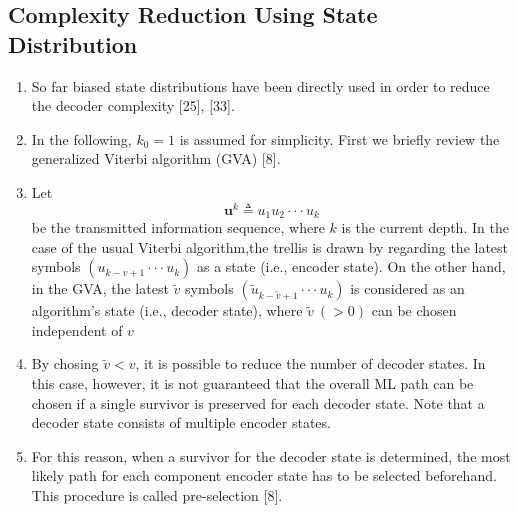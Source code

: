 \documentclass[fontsize=12pt]{article}
\theoremstyle{definition}
\begin{document}
\subsection{Complexity Reduction Using State Distribution}
\begin{enumerate}
\item So far biased state distributions have been directly used
in order to reduce the decoder complexity [25], [33]. 

\item In the
following, $k_0 = 1$ is assumed for simplicity. First we briefly
review the generalized Viterbi algorithm (GVA) [8].

\item Let 
\begin{equation}
\mathbf{u}^k \triangleq u_1u_2 \cdot \cdot \cdot u_k
\end{equation}
be the transmitted information sequence, where $k$ is the current depth. In the case of the usual Viterbi algorithm,the trellis is drawn by regarding the latest symbols $(u_{k-v+1} \cdot \cdot \cdot u_k)$
as a state (i.e., encoder state). On the other hand, in the
GVA, the latest $\tilde{v}$ symbols $(\tilde{u}_{k-\tilde{v}+1} \cdot \cdot \cdot u_k)$ is considered as an algorithm’s state (i.e., decoder state), where $\tilde{v} ~ (> 0)$  can
be chosen independent of $v$

\item By chosing $\tilde{v} <v$, it is possible to reduce the number
of decoder states. In this case, however, it is
not guaranteed that the overall ML path can be chosen if a
single survivor is preserved for each decoder state. Note that
a decoder state consists of multiple encoder states. 

\item For this reason,
when a survivor for the decoder state is determined, the most
likely path for each component encoder state has to be selected
beforehand. This procedure is called pre-selection [8].


\end{enumerate}
\end{document}

